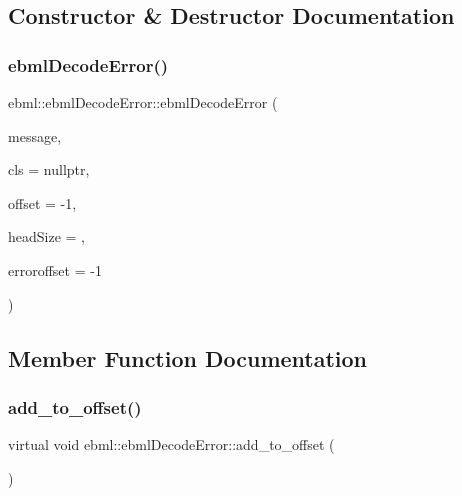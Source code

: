 \subsection{Constructor \& Destructor Documentation}
\mbox{\label{classebml_1_1ebmlDecodeError_a1b644d8b9774ec88685fcedf87cdd74f}} 
\subsubsection{\texorpdfstring{ebml\+Decode\+Error()}{ebmlDecodeError()}}
{\footnotesize\ttfamily ebml\+::ebml\+Decode\+Error\+::ebml\+Decode\+Error (\begin{DoxyParamCaption}\item[{const std\+::string \&}]{message,  }\item[{const \mbox{\hyperlink{classebml_1_1ebmlElementClass}{ebml\+Element\+Class}} $\ast$}]{cls = {\ttfamily nullptr},  }\item[{off\+\_\+t}]{offset = {\ttfamily -\/1},  }\item[{unsigned char}]{head\+Size = {},  }\item[{off\+\_\+t}]{erroroffset = {\ttfamily -\/1} }\end{DoxyParamCaption})}



\subsection{Member Function Documentation}
\mbox{\label{classebml_1_1ebmlDecodeError_a2ff987918cff7b3495e2f9583087518d}} 
\subsubsection{\texorpdfstring{add\+\_\+to\+\_\+offset()}{add\_to\_offset()}}
{\footnotesize\ttfamily virtual void ebml\+::ebml\+Decode\+Error\+::add\+\_\+to\+\_\+offset (\begin{DoxyParamCaption}\item[{off\+\_\+t}]{ }\end{DoxyParamCaption})\hspace{0.3cm}{\ttfamily [virtual]}}



